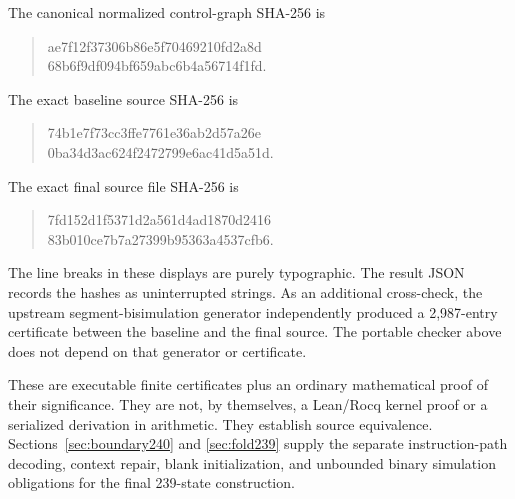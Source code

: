 The canonical normalized control-graph SHA-256 is
\begin{quote}\ttfamily\small
ae7f12f37306b86e5f70469210fd2a8d\\
68b6f9df094bf659abc6b4a56714f1fd.
\end{quote}
The exact baseline source SHA-256 is
\begin{quote}\ttfamily\small
74b1e7f73cc3ffe7761e36ab2d57a26e\\
0ba34d3ac624f2472799e6ac41d5a51d.
\end{quote}
The exact final source file SHA-256 is
\begin{quote}\ttfamily\small
7fd152d1f5371d2a561d4ad1870d2416\\
83b010ce7b7a27399b95363a4537cfb6.
\end{quote}
The line breaks in these displays are purely typographic.  The result
JSON records the hashes as uninterrupted strings.  As an additional
cross-check, the upstream segment-bisimulation
generator independently produced a 2,987-entry certificate between the
baseline and the final source.  The portable checker above does not
depend on that generator or certificate.

These are executable finite certificates plus an ordinary mathematical
proof of their significance.  They are not, by themselves, a Lean/Rocq
kernel proof or a serialized derivation in arithmetic.  They establish source equivalence.  Sections~\ref{sec:boundary240} and
\ref{sec:fold239} supply the separate instruction-path decoding, context
repair, blank initialization, and unbounded binary simulation obligations
for the final 239-state construction.
